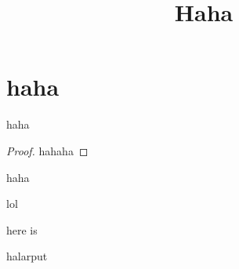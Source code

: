 \documentclass[article, 11pt, a4paper, onesize]{memoir}
\title{\vspace{-3em}Haha\vspace{-1em}}
\date{}
\author{}
\begin{document}
\maketitle

\chapter{haha}


\begin{solution}
    haha
\end{solution}


\begin{proof}
    hahaha
\end{proof}

\begin{problem}
    haha
\end{problem}

\begin{theorem}
    lol
\end{theorem}

\begin{exercise}
    here is
\end{exercise}

\begin{definition}
    halarput
\end{definition}
\end{document}
